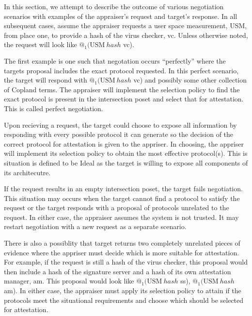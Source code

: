 \documentclass[sigconf,authordraft]{acmart}
\begin{document}
  
In this section, we attempt to describe the outcome of various
negotiation scenarios with examples of the appraiser's request and
target's response. In all subsequent cases, assume the appraiser
requests a user space measurement, USM, from place one, to provide a
hash of the virus checker, vc. Unless otherwise noted, the request
will look like $@_1 (\text{USM}\: hash$ vc).

The first example is one such that negotation occurs ``perfectly''
where the targets proposal includes the exact protocol requested. In
this \gls{perfect} scenario, the target will respond with
$@_1 (\text{USM}\: hash$ vc) and possibly some other collection of
Copland terms. The appraiser will implement the selection policy to
find the exact protocol is present in the intersection poset and
select that for attestation. This is called perfect negotiation.

Upon recieving a request, the target could choose to expose all
information by responding with every possible protocol it can generate
so the decision of the correct protocol for attestation is given to
the appriser. In choosing, the appriser will implement its selection
policy to obtain the most effective protocol(s). This is situation is
defined to be \gls{Ideal} as the target is willing to expose all
components of its architecutre.

If the request results in an empty intersection poset, the target
fails negotiation. This situation may occurs when the target cannot
find a protocol to satisfy the request or the target responds with a
proposal of protocols unrelated to the request. In either case, the
appraiser assumes the system is not trusted. It may restart
negotiation with a new request as a separate scenario.

There is also a possiblity that target returns two completely
unrelated pieces of evidence where the appriser must decide which is
more suitable for attestation. For example, if the request is still a
hash of the virus checker, this proposal would then include a hash of
the signature server and a hash of its own attestation manager,
am. This proposal would look like {$@_1 (\text{USM}\: hash$ ss),
  $@_1 (\text{USM}\: hash$ am)}. In either case, the appraiser must
apply its selection policy to attain if the protocols meet the
situational requirements and choose which should be selected for
attestation.

\end{document}
